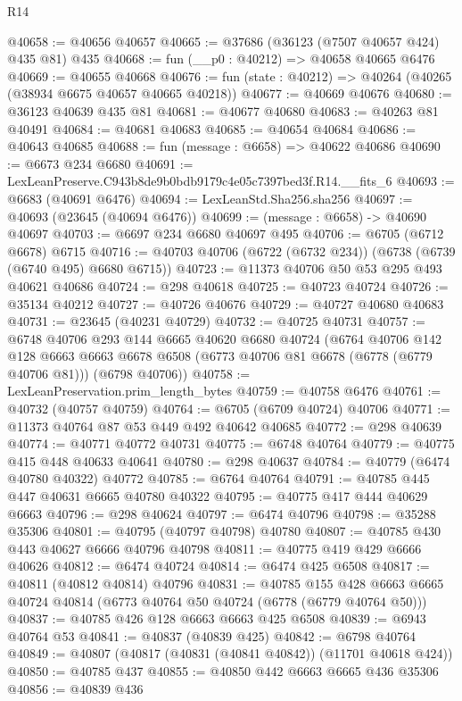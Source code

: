 \begin{lexlean}{R14}
\begin{coremodule}
@40658 := @40656 @40657
@40665 := @37686 (@36123 (@7507 @40657 @424) @435 @81) @435
@40668 := fun (__p0 : @40212) => @40658 @40665 @6476
@40669 := @40655 @40668
@40676 := fun (state : @40212) => @40264 (@40265 (@38934 @6675 @40657 @40665 @40218))
@40677 := @40669 @40676
@40680 := @36123 @40639 @435 @81
@40681 := @40677 @40680
@40683 := @40263 @81 @40491
@40684 := @40681 @40683
@40685 := @40654 @40684
@40686 := @40643 @40685
@40688 := fun (message : @6658) => @40622 @40686
@40690 := @6673 @234 @6680
@40691 := LexLeanPreserve.C943b8de9b0bdb9179c4e05c7397bed3f.R14.__fits_6
@40693 := @6683 (@40691 @6476)
@40694 := LexLeanStd.Sha256.sha256
@40697 := @40693 (@23645 (@40694 @6476))
@40699 := (message : @6658) -> @40690 @40697
@40703 := @6697 @234 @6680 @40697 @495
@40706 := @6705 (@6712 @6678) @6715
@40716 := @40703 @40706 (@6722 (@6732 @234)) (@6738 (@6739 (@6740 @495) @6680 @6715))
@40723 := @11373 @40706 @50 @53 @295 @493 @40621 @40686
@40724 := @298 @40618
@40725 := @40723 @40724
@40726 := @35134 @40212
@40727 := @40726 @40676
@40729 := @40727 @40680 @40683
@40731 := @23645 (@40231 @40729)
@40732 := @40725 @40731
@40757 := @6748
    @40706
    @293
    @144
    @6665
    @40620
    @6680
    @40724
    (@6764
      @40706
      @142
      @128
      @6663
      @6663
      @6678
      @6508
      (@6773 @40706 @81 @6678 (@6778 (@6779 @40706 @81)))
      (@6798 @40706))
@40758 := LexLeanPreservation.prim_length_bytes
@40759 := @40758 @6476
@40761 := @40732 (@40757 @40759)
@40764 := @6705 (@6709 @40724) @40706
@40771 := @11373 @40764 @87 @53 @449 @492 @40642 @40685
@40772 := @298 @40639
@40774 := @40771 @40772 @40731
@40775 := @6748 @40764
@40779 := @40775 @415 @448 @40633 @40641
@40780 := @298 @40637
@40784 := @40779 (@6474 @40780 @40322) @40772
@40785 := @6764 @40764
@40791 := @40785 @445 @447 @40631 @6665 @40780 @40322
@40795 := @40775 @417 @444 @40629 @6663
@40796 := @298 @40624
@40797 := @6474 @40796
@40798 := @35288 @35306
@40801 := @40795 (@40797 @40798) @40780
@40807 := @40785 @430 @443 @40627 @6666 @40796 @40798
@40811 := @40775 @419 @429 @6666 @40626
@40812 := @6474 @40724
@40814 := @6474 @425 @6508
@40817 := @40811 (@40812 @40814) @40796
@40831 := @40785
    @155
    @428
    @6663
    @6665
    @40724
    @40814
    (@6773 @40764 @50 @40724 (@6778 (@6779 @40764 @50)))
@40837 := @40785 @426 @128 @6663 @6663 @425 @6508
@40839 := @6943 @40764 @53
@40841 := @40837 (@40839 @425)
@40842 := @6798 @40764
@40849 := @40807 (@40817 (@40831 (@40841 @40842)) (@11701 @40618 @424))
@40850 := @40785 @437
@40855 := @40850 @442 @6663 @6665 @436 @35306
@40856 := @40839 @436

\end{coremodule}
\end{lexlean}

